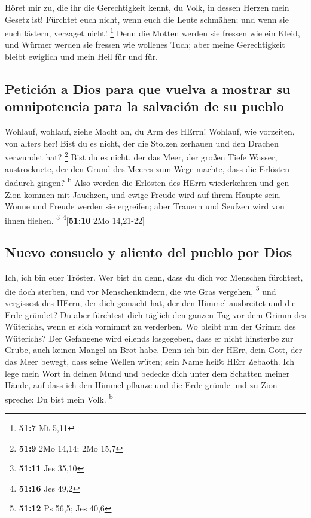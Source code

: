  Höret mir zu, die ihr die Gerechtigkeit kennt, du Volk,
in dessen Herzen mein Gesetz ist! Fürchtet euch nicht, wenn euch die
Leute schmähen; und wenn sie euch lästern, verzaget nicht! \footnote{\textbf{51:7}
  Mt 5,11}  Denn die Motten werden sie fressen wie ein
Kleid, und Würmer werden sie fressen wie wollenes Tuch; aber meine
Gerechtigkeit bleibt ewiglich und mein Heil für und für.

\hypertarget{peticiuxf3n-a-dios-para-que-vuelva-a-mostrar-su-omnipotencia-para-la-salvaciuxf3n-de-su-pueblo}{%
\subsection{Petición a Dios para que vuelva a mostrar su omnipotencia
para la salvación de su
pueblo}\label{peticiuxf3n-a-dios-para-que-vuelva-a-mostrar-su-omnipotencia-para-la-salvaciuxf3n-de-su-pueblo}}

 Wohlauf, wohlauf, ziehe Macht an, du Arm des HErrn!
Wohlauf, wie vorzeiten, von alters her! Bist du es nicht, der die
Stolzen zerhauen und den Drachen verwundet hat? \footnote{\textbf{51:9}
  2Mo 14,14; 2Mo 15,7}  Bist du es nicht, der das Meer,
der großen Tiefe Wasser, austrocknete, der den Grund des Meeres zum Wege
machte, dass die Erlösten dadurch gingen? \textsuperscript{b}
 Also werden die Erlösten des HErrn wiederkehren und gen
Zion kommen mit Jauchzen, und ewige Freude wird auf ihrem Haupte sein.
Wonne und Freude werden sie ergreifen; aber Trauern und Seufzen wird von
ihnen fliehen. \footnote{\textbf{51:11} Jes 35,10}
\footnote{\textbf{51:16} Jes 49,2}{[}\textbf{51:10} 2Mo 14,21-22{]}

\hypertarget{nuevo-consuelo-y-aliento-del-pueblo-por-dios}{%
\subsection{Nuevo consuelo y aliento del pueblo por
Dios}\label{nuevo-consuelo-y-aliento-del-pueblo-por-dios}}

 Ich, ich bin euer Tröster. Wer bist du denn, dass du
dich vor Menschen fürchtest, die doch sterben, und vor Menschenkindern,
die wie Gras vergehen, \footnote{\textbf{51:12} Ps 56,5; Jes 40,6}
 und vergissest des HErrn, der dich gemacht hat, der den
Himmel ausbreitet und die Erde gründet? Du aber fürchtest dich täglich
den ganzen Tag vor dem Grimm des Wüterichs, wenn er sich vornimmt zu
verderben. Wo bleibt nun der Grimm des Wüterichs?  Der
Gefangene wird eilends losgegeben, dass er nicht hinsterbe zur Grube,
auch keinen Mangel an Brot habe.  Denn ich bin der HErr,
dein Gott, der das Meer bewegt, dass seine Wellen wüten; sein Name heißt
HErr Zebaoth.  Ich lege mein Wort in deinen Mund und
bedecke dich unter dem Schatten meiner Hände, auf dass ich den Himmel
pflanze und die Erde gründe und zu Zion spreche: Du bist mein Volk.
\textsuperscript{b}

